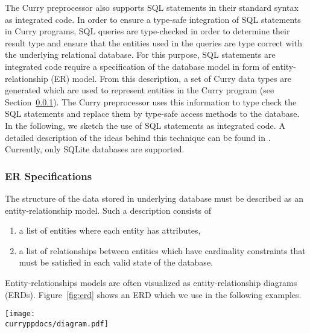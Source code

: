The Curry preprocessor also supports SQL statements in their
standard syntax as integrated code.
In order to ensure a type-safe integration of SQL statements
in Curry programs, SQL queries are type-checked in order to
determine their result type and ensure that the
entities used in the queries are type correct with the
underlying relational database.
For this purpose, SQL statements are integrated code
require a specification of the database model
in form of entity-relationship (ER) model.
From this description, a set of Curry data types are generated
which are used to represent entities in the Curry program
(see Section~\ref{sec:erd2cdbi}).
The Curry preprocessor uses this information to type check
the SQL statements and replace them by type-safe access
methods to the database.
In the following, we sketch the use of SQL statements
as integrated code.
A detailed description of the ideas behind this technique
can be found in \cite{HanusKrone17EPTCS}.
Currently, only SQLite databases are supported.


\subsubsection{ER Specifications}
\label{sec:erd2cdbi}

The structure of the data stored in underlying database
must be described as an entity-relationship model.
Such a description consists of
\begin{enumerate}
\item a list of entities where each entity has attributes,
\item a list of relationships between entities which have
      cardinality constraints that must be satisfied
      in each valid state of the database.
\end{enumerate}
%
Entity-relationships models are often visualized as
entity-relationship diagrams (ERDs).
Figure~\ref{fig:erd} shows an ERD which we use in the following examples.

\begin{figure*}[t]
\begin{center}
  \texttt{[image: \\curryppdocs/diagram.pdf]}
\end{center}
\caption{A simple entity-relationship diagram for university lectures \cite{HanusKrone17EPTCS}}
\label{fig:erd}
\end{figure*}

